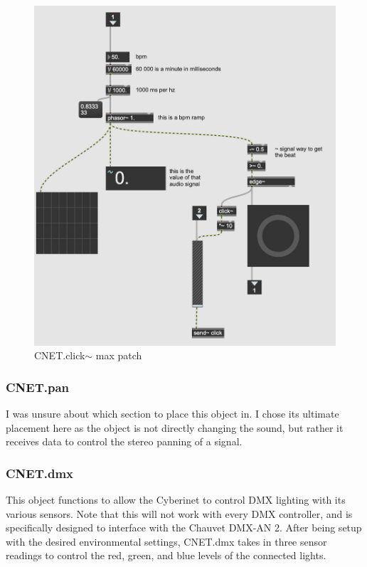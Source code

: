 \begin{figure}
    \centering
    \includegraphics[scale=0.2]{diagrams/maxPatches/CNET.click~.jpg}
    \caption{CNET.click$\sim$ max patch}
    \label{fig:CNET.clickPAtch}
\end{figure}

\subsubsection{CNET.pan}
I was unsure about which section to place this object in. I chose its ultimate placement here as the object is not directly changing the sound, but rather it receives data to control the stereo panning of a signal.

\subsubsection{CNET.dmx}
This object functions to allow the Cyberinet to control DMX lighting with its various sensors. Note that this will not work with every DMX controller, and is specifically designed to interface with the Chauvet DMX-AN 2. After being setup with the desired environmental settings, CNET.dmx takes in three sensor readings to control the red, green, and blue levels of the connected lights.

